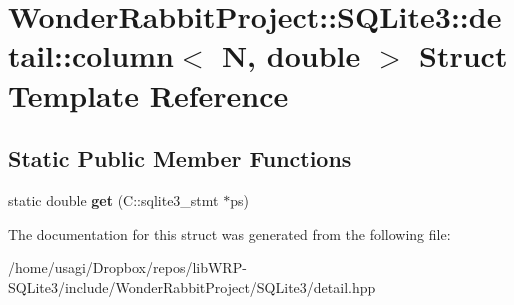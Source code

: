 \hypertarget{structWonderRabbitProject_1_1SQLite3_1_1detail_1_1column_3_01N_00_01double_01_4}{\section{Wonder\-Rabbit\-Project\-:\-:S\-Q\-Lite3\-:\-:detail\-:\-:column$<$ N, double $>$ Struct Template Reference}
\label{structWonderRabbitProject_1_1SQLite3_1_1detail_1_1column_3_01N_00_01double_01_4}
}
\subsection*{Static Public Member Functions}
\begin{DoxyCompactItemize}
\item 
\hypertarget{structWonderRabbitProject_1_1SQLite3_1_1detail_1_1column_3_01N_00_01double_01_4_a3ab2e89e6e5e0e931c6d634038feeb8e}{static double {\bfseries get} (C\-::sqlite3\-\_\-stmt $\ast$ps)}\label{structWonderRabbitProject_1_1SQLite3_1_1detail_1_1column_3_01N_00_01double_01_4_a3ab2e89e6e5e0e931c6d634038feeb8e}

\end{DoxyCompactItemize}


The documentation for this struct was generated from the following file\-:\begin{DoxyCompactItemize}
\item 
/home/usagi/\-Dropbox/repos/lib\-W\-R\-P-\/\-S\-Q\-Lite3/include/\-Wonder\-Rabbit\-Project/\-S\-Q\-Lite3/detail.\-hpp\end{DoxyCompactItemize}
